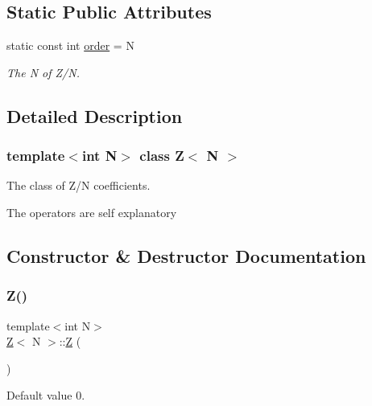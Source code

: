 \subsection*{Static Public Attributes}
\begin{DoxyCompactItemize}
\item 
static const int \hyperlink{classZ_a8da63061091de9ee7a146a856f70c4b8}{order} = N
\begin{DoxyCompactList}\small\item\em The N of Z/N. \end{DoxyCompactList}\end{DoxyCompactItemize}


\subsection{Detailed Description}
\subsubsection*{template$<$int N$>$\newline
class Z$<$ N $>$}

The class of Z/N coefficients. 

The operators are self explanatory 

\subsection{Constructor \& Destructor Documentation}
\mbox{\label{classZ_a21a5a03bc44e0a76607d1b89dc9e31cb}} 
\subsubsection{\texorpdfstring{Z()}{Z()}\hspace{0.1cm}{\footnotesize\ttfamily [1/4]}}
{\footnotesize\ttfamily template$<$int N$>$ \\
\hyperlink{classZ}{Z}$<$ N $>$\+::\hyperlink{classZ}{Z} (\begin{DoxyParamCaption}{ }\end{DoxyParamCaption})\hspace{0.3cm}{\ttfamily [inline]}}



Default value 0. 

\mbox{\label{classZ_aa6546d6135c97a5b8df9028068dfe0c1}} 
